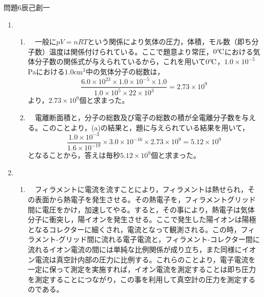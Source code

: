 \documentclass[fleqn]{jbook}
\begin{document}
\begin{answer}{問題6}{辰己創一}
\setcounter{equation}{0}



\begin{enumerate}

  \item 　
  \begin{enumerate}
  
    \item 　一般に$pV=nRT$という関係により気体の圧力，体積，モル数（即ち分子数）温度は関係付けられている。ここで題意より常圧，$0^{\circ}\!\rm C$における気体分子数の関係式が与えられているから，これを用いて$0^{\circ}\!\rm C$，$1.0\times10^{-5}$Paにおける$1.0$cm$^3$中の気体分子の総数は，
\begin{equation}
    \frac{6.0\times 10^{23} \times 1.0 \times 10^{-5} \times 1.0}{1.0\times 10^5 \times 22 \times 10^3 } = 2.73 \times 10^9\nonumber
\end{equation}
より，$2.73 \times 10^9$個と求まった。\\
    
    \item 　電離断面積と，分子の総数及び電子の総数の積が全電離分子数を与える。このことより，(a)の結果と，題に与えられている結果を用いて，
\begin{equation}
    \frac{1.0\times 10^{-3}}{1.6 \times 10^{-19}} \times 3.0\times 10^{-16} \times 2.73 \times 10^9 = 5.12 \times 10^9\nonumber
\end{equation}
となることから，答えは毎秒$5.12 \times 10^9$個と求まった。\\
    
\end{enumerate}

  \item 　
  \begin{enumerate}
    
    \item 　フィラメントに電流を流すことにより，フィラメントは熱せられ，その表面から熱電子を発生させる。その熱電子を，フィラメントグリッド間に電圧をかけ，加速してやる。すると，その事により，熱電子は気体分子に衝突し，陽イオンを発生させる。ここで発生した陽イオンは陽極となるコレクターに細くされ，電流となって観測される。この時，フィラメント-グリッド間に流れる電子電流と，フィラメント-コレクター間に流れるイオン電流の間には単純な比例関係が成り立ち，また同様にイオン電流は真空計内部の圧力に比例する。これらのことより，電子電流を一定に保って測定を実施すれば，イオン電流を測定することは即ち圧力を測定することにつながり，この事を利用して真空計の圧力を測定するのである。\\
    

\end{enumerate}
\end{enumerate}
\end{answer}
\end{document}
